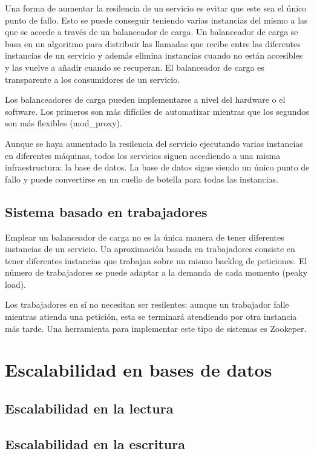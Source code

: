\documentclass[11pt,a4paper]{article}
\begin{document}
Una forma de aumentar la resilencia de un servicio es evitar que este sea el único punto de fallo. Esto se puede conseguir teniendo varias instancias del mismo a las que se accede a través de un balanceador de carga. Un balanceador de carga se basa en un algoritmo para distribuir las llamadas que recibe entre las diferentes instancias de un servicio y además elimina instancias cuando no están accesibles y las vuelve a añadir cuando se recuperan. El balanceador de carga es transparente a los consumidores de un servicio.

Los balanceadores de carga pueden implementarse a nivel del hardware o el software. Los primeros son más difíciles de automatizar mientras que los segundos son más flexibles (mod\_proxy).

Aunque se haya aumentado la resilencia del servicio ejecutando varias instancias en diferentes máquinas, todos los servicios siguen accediendo a una misma infraestructura: la base de datos. La base de datos sigue siendo un único punto de fallo y puede convertirse en un cuello de botella para todas las instancias.

\subsection{Sistema basado en trabajadores}

Emplear un balanceador de carga no es la única manera de tener diferentes instancias de un servicio. Un aproximación basada en trabajadores consiste en tener diferentes instancias que trabajan sobre un mismo backlog de peticiones. El número de trabajadores se puede adaptar a la demanda de cada momento (peaky load). 

Los trabajadores en sí no necesitan ser resilentes: aunque un trabajador falle mientras atienda una petición, esta se terminará atendiendo por otra instancia más tarde. Una herramienta para implementar este tipo de sistemas es Zookeper.

\section{Escalabilidad en bases de datos}

\subsection{Escalabilidad en la lectura}

\subsection{Escalabilidad en la escritura}
\end{document}
